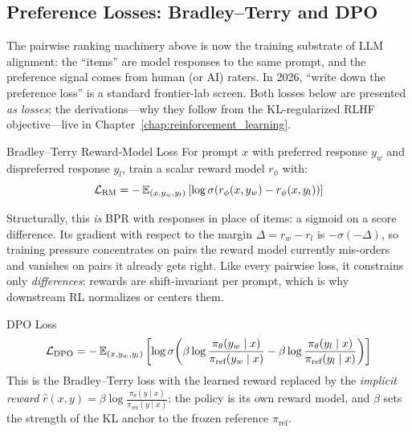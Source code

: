 \subsection{Preference Losses: Bradley--Terry and DPO}
\label{sec:preference_losses}

The pairwise ranking machinery above is now the training substrate of LLM alignment: the ``items'' are model responses to the same prompt, and the preference signal comes from human (or AI) raters. In 2026, ``write down the preference loss'' is a standard frontier-lab screen. Both losses below are presented \textit{as losses}; the derivations---why they follow from the KL-regularized RLHF objective---live in Chapter~\ref{chap:reinforcement_learning}.

\begin{mathresult}{Bradley--Terry Reward-Model Loss}
For prompt $x$ with preferred response $y_w$ and dispreferred response $y_l$, train a scalar reward model $r_\phi$ with:
\begin{equation}
\mathcal{L}_{\text{RM}} = -\operatorname{\mathbb{E}}_{(x, y_w, y_l)}\left[\log \sigma\!\left(r_\phi(x, y_w) - r_\phi(x, y_l)\right)\right]
\end{equation}
\end{mathresult}

Structurally, this \textit{is} BPR with responses in place of items: a sigmoid on a score difference. Its gradient with respect to the margin $\Delta = r_w - r_l$ is $-\sigma(-\Delta)$, so training pressure concentrates on pairs the reward model currently mis-orders and vanishes on pairs it already gets right. Like every pairwise loss, it constrains only \textit{differences}: rewards are shift-invariant per prompt, which is why downstream RL normalizes or centers them.

\begin{mathresult}{DPO Loss}
\begin{equation}
\mathcal{L}_{\text{DPO}} = -\operatorname{\mathbb{E}}_{(x, y_w, y_l)}\left[\log \sigma\!\left(\beta \log \frac{\pi_\theta(y_w \mid x)}{\pi_{\text{ref}}(y_w \mid x)} - \beta \log \frac{\pi_\theta(y_l \mid x)}{\pi_{\text{ref}}(y_l \mid x)}\right)\right]
\end{equation}
This is the Bradley--Terry loss with the learned reward replaced by the \textit{implicit reward} $\hat{r}(x,y) = \beta \log \frac{\pi_\theta(y \mid x)}{\pi_{\text{ref}}(y \mid x)}$: the policy is its own reward model, and $\beta$ sets the strength of the KL anchor to the frozen reference $\pi_{\text{ref}}$.
\end{mathresult}

